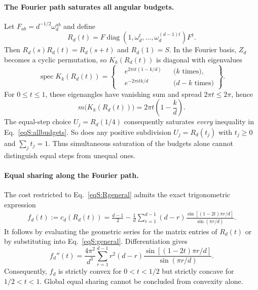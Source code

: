 \documentclass[aps,prl,reprint,superscriptaddress,nofootinbib]{revtex4-2}
\newcommand{\diag}{\operatorname{diag}}
\newcommand{\spec}{\operatorname{spec}}
\begin{document}
\paragraph{The Fourier path saturates all angular budgets.}
Let $F_{ab}=d^{-1/2}\omega_d^{ab}$ and define
\begin{equation}
R_d(t)=F\diag(1,\omega_d^t,\ldots,\omega_d^{(d-1)t})F^\dagger.
\label{eqS:Rgeneral}
\end{equation}
Then $R_d(s)R_d(t)=R_d(s+t)$ and $R_d(1)=S$. In the Fourier basis, $Z_d$ becomes a cyclic permutation, so $K_k(R_d(t))$ is diagonal with eigenvalues
\begin{equation}
\spec K_k(R_d(t))=\left\{
\begin{aligned}
&e^{2\pi it(1-k/d)}&&\text{($k$ times)},\\
&e^{-2\pi itk/d}&&\text{($d-k$ times)}
\end{aligned}\right\}.
\label{eqS:specall}
\end{equation}
For $0\leq t\leq1$, these eigenangles have vanishing sum and spread $2\pi t\leq2\pi$, hence
\begin{equation}
m\bigl(K_k(R_d(t))\bigr)=2\pi t\left(1-\frac{k}{d}\right).
\label{eqS:mR}
\end{equation}
The equal-step choice $U_j=R_d(1/4)$ consequently saturates \emph{every} inequality in Eq.~\eqref{eqS:allbudgets}. So does any positive subdivision $U_j=R_d(t_j)$ with $t_j\geq0$ and $\sum_j t_j=1$. Thus simultaneous saturation of the budgets alone cannot distinguish equal steps from unequal ones.

\paragraph{Equal sharing along the Fourier path.}
The cost restricted to Eq.~\eqref{eqS:Rgeneral} admits the exact trigonometric expression
\begin{equation}
\begin{split}
f_d(t):=c_d(R_d(t))=\frac{d-1}{2}-\frac1d\sum_{r=1}^{d-1}
(d-r)\frac{\sin[(1-2t)\pi r/d]}{\sin(\pi r/d)}.
\end{split}
\label{eqS:ft}
\end{equation}
It follows by evaluating the geometric series for the matrix entries of $R_d(t)$ or by substituting into Eq.~\eqref{eqS:general}. Differentiation gives
\begin{equation}
f_d''(t)=\frac{4\pi^2}{d^3}\sum_{r=1}^{d-1}r^2(d-r)
\frac{\sin[(1-2t)\pi r/d]}{\sin(\pi r/d)}.
\label{eqS:fsecond}
\end{equation}
Consequently, $f_d$ is strictly convex for $0<t<1/2$ but strictly concave for $1/2<t<1$. Global equal sharing cannot be concluded from convexity alone.
\end{document}

